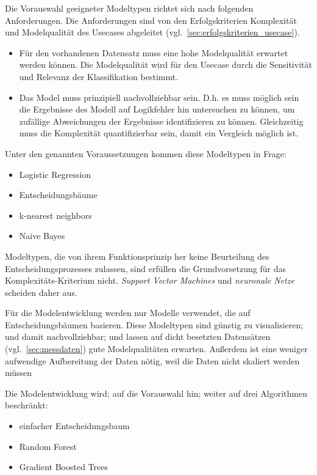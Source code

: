 Die Vorauswahl geeigneter Modeltypen richtet sich nach folgenden Anforderungen. Die Anforderungen sind von den Erfolgskriterien Komplexität und Modelqualität des Usecases abgeleitet (vgl.~\cref{sec:erfolgskriterien_usecase}).

\begin{itemize}
    \item Für den vorhandenen Datensatz muss eine hohe Modelqualität erwartet werden können. Die Modelqualität wird für den Usecase durch die Sensitivität und Relevanz der Klassifikation bestimmt.
    \item Das Model muss prinzipiell nachvollziehbar sein. D.h. es muss möglich sein die Ergebnisse des Modell auf Logikfehler hin untersuchen zu können, um zufällige Abweichungen der Ergebnisse identifizieren zu können. Gleichzeitig muss die Komplexität quantifizierbar sein, damit ein Vergleich möglich ist.
\end{itemize}

Unter den genannten Voraussetzungen kommen diese Modeltypen in Frage:
\begin{itemize}
    \item Logistic Regression
    \item Entscheidungsbäume
    \item k-nearest neighbors
    \item Naive Bayes
\end{itemize}

Modeltypen, die von ihrem Funktionsprinzip her keine Beurteilung des Entscheidungsprozesses zulassen, sind erfüllen die Grundvorsetzung für das Komplexitäts-Kriterium nicht. \textit{Support Vector Machines} und \textit{neuronale Netze} scheiden daher aus.

Für die Modelentwicklung werden nur Modelle verwendet, die auf Entscheidungsbäumen basieren. Diese Modeltypen sind günstig zu visualisieren; und damit nachvollziehbar; und lassen auf dicht besetzten Datensätzen (vgl.~\cref{sec:messdaten}) gute Modelqualitäten erwarten. Außerdem ist eine weniger aufwendige Aufbereitung der Daten nötig, weil die Daten nicht skaliert werden müssen~\cite[S.~84--85]{Muller.2017}

Die Modelentwicklung wird; auf die Vorauswahl hin; weiter auf drei Algorithmen beschränkt:
\begin{itemize}
    \item einfacher Entscheidungsbaum
    \item Random Forest
    \item Gradient Boosted Trees
\end{itemize}
